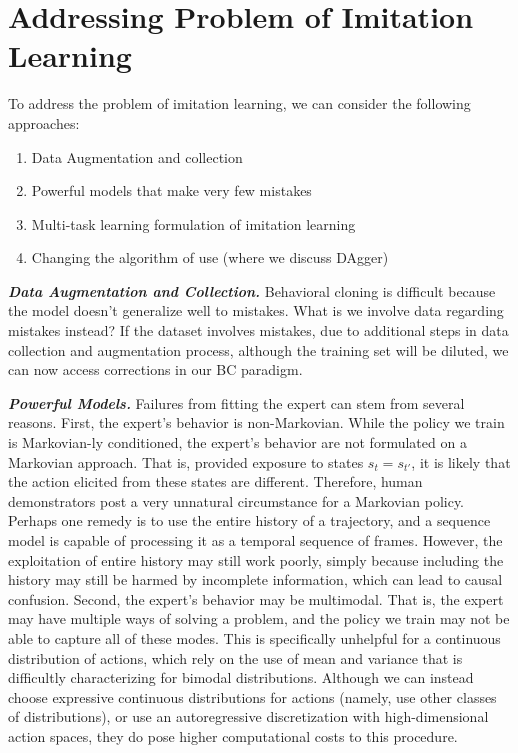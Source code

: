 \section{Addressing Problem of Imitation Learning}
To address the problem of imitation learning, we can consider the following approaches:
\begin{enumerate}
    \item Data Augmentation and collection
    \item Powerful models that make very few mistakes
    \item Multi-task learning formulation of imitation learning
    \item Changing the algorithm of use (where we discuss DAgger)
\end{enumerate}

\textbf{\textit{Data Augmentation and Collection.}}
Behavioral cloning is difficult because the model doesn't generalize well to mistakes.
What is we involve data regarding mistakes instead? If the dataset involves mistakes, due to additional steps in data collection and augmentation process, although the training set will be diluted, we can now access corrections in our BC paradigm.

\textbf{\textit{Powerful Models.}}
Failures from fitting the expert can stem from several reasons.
First, the expert's behavior is non-Markovian. While the policy we train is Markovian-ly conditioned, the expert's behavior are not formulated on a Markovian approach. That is, provided exposure to states $s_t = s_{t'}$, it is likely that the action elicited from these states are different.
Therefore, human demonstrators post a very unnatural circumstance for a Markovian policy.
Perhaps one remedy is to use the entire history of a trajectory, and a sequence model is capable of processing it as a temporal sequence of frames.
However, the exploitation of entire history may still work poorly, simply because including the history may still be harmed by incomplete information, which can lead to causal confusion.
Second, the expert's behavior may be multimodal. That is, the expert may have multiple ways of solving a problem, and the policy we train may not be able to capture all of these modes.
This is specifically unhelpful for a continuous distribution of actions, which rely on the use of mean and variance that is difficultly characterizing for bimodal distributions.
Although we can instead choose expressive continuous distributions for actions (namely, use other classes of distributions), or use an autoregressive discretization with high-dimensional action spaces, they do pose higher computational costs to this procedure.

